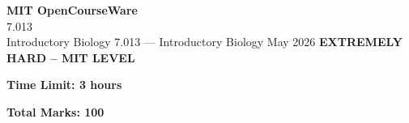 \documentclass[12pt,a4paper]{exam}
\begin{document}
\begin{center}
{\LARGE \textbf{MIT OpenCourseWare}}\\7.013\\Introductory Biology
\vspace{0.5cm}
{7.013} --- {Introductory Biology}
\vspace{0.3cm}
May 2026
\vspace{0.3cm}
\textbf{EXTREMELY HARD -- MIT LEVEL}
\end{center}

\begin{center}
\textbf{Time Limit: 3 hours}
\end{center}

\begin{center}
\textbf{Total Marks: 100}
\end{center}

\vspace{0.5cm}
\end{document}
